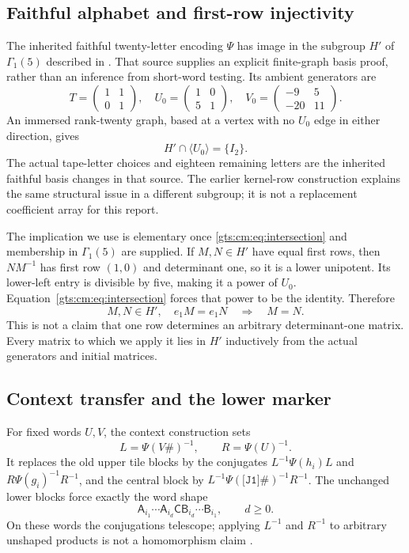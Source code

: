 \documentclass[11pt,letterpaper]{article}
\theoremstyle{definition}
\theoremstyle{remark}
\begin{document}
\subsection{Faithful alphabet and first-row injectivity}
The inherited faithful twenty-letter encoding $\Psi$ has image in the subgroup $H'$ of $\Gamma_1(5)$ described in \cite{cm-gamma}. That source supplies an explicit finite-graph basis proof, rather than an inference from short-word testing. Its ambient generators are
\[
 T=\begin{pmatrix}1&1\\0&1\end{pmatrix},\quad
 U_0=\begin{pmatrix}1&0\\5&1\end{pmatrix},\quad
 V_0=\begin{pmatrix}-9&5\\-20&11\end{pmatrix}.
\]
An immersed rank-twenty graph, based at a vertex with no $U_0$ edge in either direction, gives
\begin{equation}\label{gts:cm:eq:intersection}
 H'\cap\langle U_0\rangle=\{I_2\}.
\end{equation}
The actual tape-letter choices and eighteen remaining letters are the inherited faithful basis changes in that source. The earlier kernel-row construction \cite{cm-kernel} explains the same structural issue in a different subgroup; it is not a replacement coefficient array for this report.

The implication we use is elementary once \eqref{gts:cm:eq:intersection} and membership in $\Gamma_1(5)$ are supplied. If $M,N\in H'$ have equal first rows, then $NM^{-1}$ has first row $(1,0)$ and determinant one, so it is a lower unipotent. Its lower-left entry is divisible by five, making it a power of $U_0$. Equation~\eqref{gts:cm:eq:intersection} forces that power to be the identity. Therefore
\begin{equation}\label{gts:cm:eq:rowinjective}
 M,N\in H',\quad e_1M=e_1N\quad\Longrightarrow\quad M=N.
\end{equation}
This is not a claim that one row determines an arbitrary determinant-one matrix. Every matrix to which we apply it lies in $H'$ inductively from the actual generators and initial matrices.

\subsection{Context transfer and the lower marker}
For fixed words $U,V$, the context construction sets
\[
 L=\Psi(V\#)^{-1},\qquad R=\Psi(U)^{-1}.
\]
It replaces the old upper tile blocks by the conjugates $L^{-1}\Psi(h_i)L$ and $R\Psi(g_i)^{-1}R^{-1}$, and the central block by $L^{-1}\Psi(\texttt{[J1]\#})^{-1}R^{-1}$. The unchanged lower blocks force exactly the word shape
\begin{equation}\label{gts:cm:eq:shape}
 \mathsf A_{i_1}\cdots\mathsf A_{i_d}\mathsf C
 \mathsf B_{i_d}\cdots\mathsf B_{i_1},\qquad d\ge0.
\end{equation}
On these words the conjugations telescope; applying $L^{-1}$ and $R^{-1}$ to arbitrary unshaped products is not a homomorphism claim \cite{cm-context}.
\end{document}
